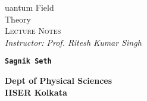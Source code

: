 \documentclass{scrartcl}
\begin{document}
\makeatletter
\begin{titlepage}
    \vspace*{2cm}
    
        \begin{center}
            {\rmfamily
                \Huge{\textcolor{blue!30!black}{%
                    \textmd{{}}uantum {\HUGE F}ield \\
                     {\HUGE T}heory%
                }}\\[0.7cm]
                
                
                \Large \textsc{Lecture Notes} \\[0.3cm]
               \Large \textit{Instructor: Prof. Ritesh Kumar Singh }\\[0.7cm]

            }
            \end{center}
       
        \begin{figure}[H]
            \centering
           
        \end{figure}
        \vspace{1cm}
        \begin{center}
           \Large \texttt{\textbf{{\LARGE  S}agnik {\LARGE S}eth }}
        \end{center}
        \vspace{0.5cm}
      \begin{center}
    \textbf{ Dept of Physical Sciences} \\
    \textbf{IISER Kolkata}
    \vspace{0.5cm}

   
\end{center}

\end{titlepage}

  
       
\tableofcontents
\newpage

\end{document}
